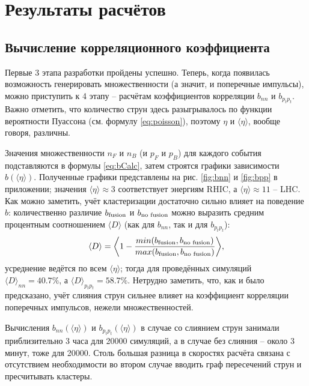 \section{Результаты расчётов}
\subsection{Вычисление корреляционного коэффициента}
Первые 3 этапа разработки пройдены успешно.
Теперь, когда появилась возможность генерировать множественности (а значит, и поперечные импульсы), можно приступить к 4 этапу -- расчётам коэффициентов корреляции $b_{nn}$ и $b_{p_tp_t}$.
Важно отметить, что количество струн здесь разыгрывалось по функции вероятности Пуассона (см. формулу \ref{eq:poisson}), поэтому $\eta$ и $\langle \eta \rangle$, вообще говоря, различны.

Значения множественности $n_F$ и $n_B$ (и $p_F$ и $p_B$) для каждого события подставляются в формулы \ref{eq:bCalc}, затем строятся графики зависимости $b(\langle \eta \rangle)$. Полученные графики представлены на рис. \ref{fig:bnn} и \ref{fig:bpp} в приложении; значения $\langle \eta \rangle \approx 3$ соответствует энергиям RHIC, а $\langle \eta \rangle \approx 11$ -- LHC. 
Как можно заметить, учёт кластеризации достаточно сильно влияет на поведение $b$: количественно различие $b_{\textnormal{fusion}}$ и $b_{\textnormal{no fusion}}$ можно выразить средним процентным соотношением $\langle D \rangle$ (как для $b_{nn}$, так и для $b_{p_tp_t}$):
\begin{equation} \label{eq:bfbn}
	\langle D \rangle = \bigg \langle 1 - \frac{min(b_{\textnormal{fusion}}, b_{\textnormal{no fusion}})}{max(b_{\textnormal{fusion}}, b_{\textnormal{no fusion}})} \bigg \rangle,
\end{equation}
усреднение ведётся по всем $\langle \eta \rangle$; тогда для проведённых симуляций $\langle D \rangle _{nn} = 40.7 \%$, а $\langle D \rangle _{p_tp_t} = 58.7 \%$. Нетрудно заметить, что, как и было предсказано, учёт слияния струн сильнее влияет на коэффициент корреляции поперечных импульсов, нежели множественностей.

Вычисления $b_{nn}(\langle \eta \rangle)$ и $b_{p_tp_t}(\langle \eta \rangle)$ в случае со слиянием струн занимали приблизительно 3 часа для 20000 симуляций, а в случае без слияния -- около 3 минут, тоже для 20000. Столь большая разница в скоростях расчёта связана с отсутствием необходимости во втором случае вводить граф пересечений струн и пресчитывать кластеры.
